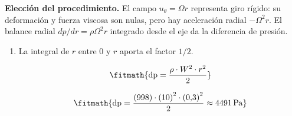 \noindent\textbf{Elección del procedimiento.} El campo $u_\theta=\Omega r$ representa giro rígido: su deformación y fuerza viscosa son nulas, pero hay aceleración radial $-\Omega^2r$. El balance radial $dp/dr=\rho\Omega^2r$ integrado desde el eje da la diferencia de presión.

\begin{enumerate}

\item La integral de $r$ entre 0 y $r$ aporta el factor $1/2$.

\[\fitmath{\mathrm{dp}=\frac{\rho\cdot {W}^{2}\cdot {r}^{2}}{2}}\]

\[\fitmath{\mathrm{dp}=\frac{(998)\cdot {(10)}^{2}\cdot {(0{,}3)}^{2}}{2}\approx 4491\,\mathrm{Pa}}\]

\end{enumerate}
